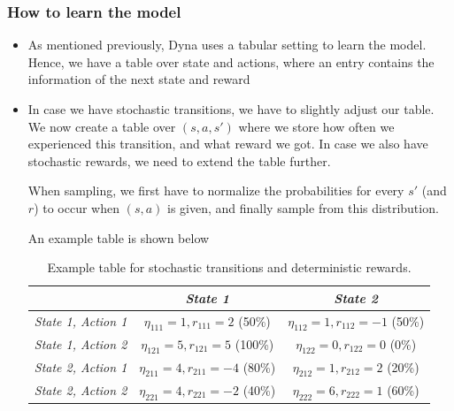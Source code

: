 \subsubsection{How to learn the model}
\begin{itemize}
	\item As mentioned previously, Dyna uses a tabular setting to learn the model. Hence, we have a table over state and actions, where an entry contains the information of the next state and reward
	\item In case we have stochastic transitions, we have to slightly adjust our table. We now create a table over $(s,a,s')$ where we store how often we experienced this transition, and what reward we got. In case we also have stochastic rewards, we need to extend the table further.
	
	When sampling, we first have to normalize the probabilities for every $s'$ (and $r$) to occur when $(s,a)$ is given, and finally sample from this distribution.
	
	An example table is shown below
	\begin{table}[ht!]
		\centering
		\begin{tabular}{c|cc}
			& \textit{State 1} & \textit{State 2}\\
			\hline
			\textit{State 1, Action 1} & $\eta_{111}=1, r_{111}=2$ (50\%) & $\eta_{112}=1, r_{112}=-1$ (50\%)\\
			\textit{State 1, Action 2} & $\eta_{121}=5, r_{121}=5$ (100\%) & $\eta_{122}=0, r_{122}=0$ (0\%) \\
			\textit{State 2, Action 1}  & $\eta_{211}=4, r_{211}=-4$ (80\%) & $\eta_{212}=1, r_{212}=2$ (20\%)  \\
			\textit{State 2, Action 2} & $\eta_{221}=4, r_{221}=-2$ (40\%) & $\eta_{222}=6, r_{222}=1$ (60\%) \\
		\end{tabular}
		\caption{Example table for stochastic transitions and deterministic rewards.}
	\end{table}
\end{itemize}
